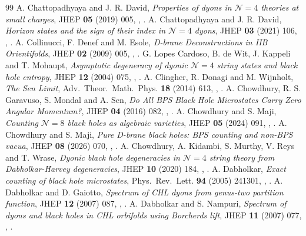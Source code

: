 \begin{thebibliography}{99}
 A. Chattopadhyaya and J. R. David, \emph{Properties of dyons in $\mathcal N=4$ theories at small charges}, JHEP \textbf{05} (2019) 005, , .
 A. Chattopadhyaya and J. R. David, \emph{Horizon states and the sign of their index in $\mathcal N=4$ dyons}, JHEP \textbf{03} (2021) 106, , .
 A. Collinucci, F. Denef and M. Esole, \emph{D-brane Deconstructions in IIB Orientifolds}, JHEP \textbf{02} (2009) 005, , .
 G. Lopes Cardoso, B. de Wit, J. Kappeli and T. Mohaupt, \emph{Asymptotic degeneracy of dyonic $\mathcal N=4$ string states and black hole entropy}, JHEP \textbf{12} (2004) 075, , .
 A. Clingher, R. Donagi and M. Wijnholt, \emph{The Sen Limit}, Adv.\ Theor.\ Math.\ Phys. \textbf{18} (2014) 613, , .
 A. Chowdhury, R. S. Garavuso, S. Mondal and A. Sen, \emph{Do All BPS Black Hole Microstates Carry Zero Angular Momentum?}, JHEP \textbf{04} (2016) 082, , .
 A. Chowdhury and S. Maji, \emph{Counting $\mathcal N=8$ black holes as algebraic varieties}, JHEP \textbf{05} (2024) 091, , .
 A. Chowdhury and S. Maji, \emph{Pure D-brane black holes: BPS counting and non-BPS vacua}, JHEP \textbf{08} (2026) 070, , .
 A. Chowdhury, A. Kidambi, S. Murthy, V. Reys and T. Wrase, \emph{Dyonic black hole degeneracies in $\mathcal N=4$ string theory from Dabholkar-Harvey degeneracies}, JHEP \textbf{10} (2020) 184, , .
 A. Dabholkar, \emph{Exact counting of black hole microstates}, Phys.\ Rev.\ Lett. \textbf{94} (2005) 241301, , .
 A. Dabholkar and D. Gaiotto, \emph{Spectrum of CHL dyons from genus-two partition function}, JHEP \textbf{12} (2007) 087, , .
 A. Dabholkar and S. Nampuri, \emph{Spectrum of dyons and black holes in CHL orbifolds using Borcherds lift}, JHEP \textbf{11} (2007) 077, , .

\end{thebibliography}
